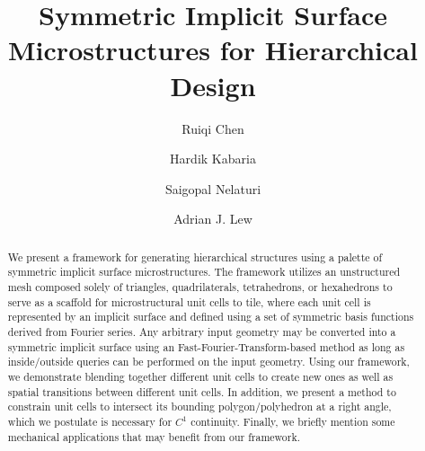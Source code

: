 \documentclass[acmtog]{acmart}
\begin{document}
\title{Symmetric Implicit Surface Microstructures for Hierarchical Design}

\author{Ruiqi Chen}
\author{Hardik Kabaria}
\author{Saigopal Nelaturi}

\author{Adrian J. Lew}

\renewcommand{\shortauthors}{Chen et al.}

\begin{abstract}
  We present a framework for generating hierarchical structures using a palette of symmetric implicit surface microstructures. The framework utilizes an unstructured mesh composed solely of triangles, quadrilaterals, tetrahedrons, or hexahedrons to serve as a scaffold for microstructural unit cells to tile, where each unit cell is represented by an implicit surface and defined using a set of symmetric basis functions derived from Fourier series. Any arbitrary input geometry may be converted into a symmetric implicit surface using an Fast-Fourier-Transform-based method as long as inside/outside queries can be performed on the input geometry. Using our framework, we demonstrate blending together different unit cells to create new ones as well as spatial transitions between different unit cells. In addition, we present a method to constrain unit cells to intersect its bounding polygon/polyhedron at a right angle, which we postulate is necessary for $C^1$ continuity. Finally, we briefly mention some mechanical applications that may benefit from our framework.
\end{abstract}
\end{document}
